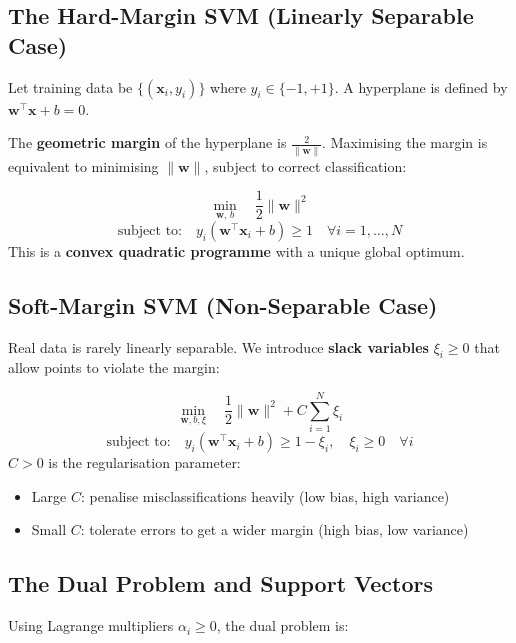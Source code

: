 \documentclass[12pt,a4paper]{article}
\newcommand{\x}{\mathbf{x}}
\newcommand{\w}{\mathbf{w}}
\begin{document}
\subsection{The Hard-Margin SVM (Linearly Separable Case)}

Let training data be $\{(\x_i, y_i)\}$ where $y_i \in \{-1, +1\}$. A hyperplane is defined by $\w^\top\x + b = 0$.

The \textbf{geometric margin} of the hyperplane is $\frac{2}{\|\w\|}$. Maximising the margin is equivalent to minimising $\|\w\|$, subject to correct classification:

\begin{tcolorbox}[defbox, title={Hard-Margin SVM — Primal Optimisation Problem}]
\[
  \min_{\w,\,b}\quad \frac{1}{2}\|\w\|^2
\]
\[
  \text{subject to:}\quad y_i(\w^\top\x_i + b) \geq 1 \quad \forall i = 1,\ldots,N
\]
This is a \textbf{convex quadratic programme} with a unique global optimum.
\end{tcolorbox}

\subsection{Soft-Margin SVM (Non-Separable Case)}

Real data is rarely linearly separable. We introduce \textbf{slack variables} $\xi_i \geq 0$ that allow points to violate the margin:

\begin{tcolorbox}[defbox, title={Soft-Margin SVM — Primal Problem}]
\[
  \min_{\w,b,\xi}\quad \frac{1}{2}\|\w\|^2 + C\sum_{i=1}^{N}\xi_i
\]
\[
  \text{subject to:}\quad y_i(\w^\top\x_i + b) \geq 1 - \xi_i,\quad \xi_i \geq 0 \quad \forall i
\]
\textbf{$C > 0$} is the regularisation parameter:
\begin{itemize}[itemsep=2pt]
  \item Large $C$: penalise misclassifications heavily (low bias, high variance)
  \item Small $C$: tolerate errors to get a wider margin (high bias, low variance)
\end{itemize}
\end{tcolorbox}

\subsection{The Dual Problem and Support Vectors}

Using Lagrange multipliers $\alpha_i \geq 0$, the dual problem is:
\end{document}
